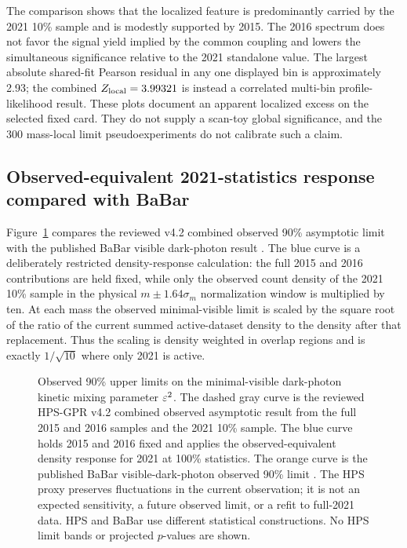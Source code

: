 The comparison shows that the localized feature is predominantly carried by the
2021 10\% sample and is modestly supported by 2015. The 2016 spectrum does not
favor the signal yield implied by the common coupling and lowers the
simultaneous significance relative to the 2021 standalone value. The largest
absolute shared-fit Pearson residual in any one displayed bin is approximately
2.93; the combined $Z_{\mathrm{local}}=3.99321$ is instead a
correlated multi-bin profile-likelihood result. These plots document an
apparent localized excess on the selected fixed card. They do not supply a
scan-toy global significance, and the 300 mass-local limit pseudoexperiments do
not calibrate such a claim.

\subsection{Observed-equivalent 2021-statistics response compared with BaBar}
\label{sec:results-v4p2-babar-response}

Figure~\ref{fig:results-v4p2-babar-response} compares the reviewed v4.2
combined observed 90\% asymptotic \CLs{} limit with the published BaBar visible
dark-photon result \cite{BaBarDarkPhoton2014}.  The blue curve is a deliberately
restricted density-response calculation: the full 2015 and 2016 contributions
are held fixed, while only the observed count density of the 2021 10\% sample
in the physical $m\pm1.64\sigma_m$ normalization window is multiplied by ten.
At each mass the observed minimal-visible limit is scaled by the square root of
the ratio of the current summed active-dataset density to the density after
that replacement.  Thus the scaling is density weighted in overlap regions and
is exactly $1/\sqrt{10}$ where only 2021 is active.

\begin{figure}[H]
\centering
{}
\caption{Observed 90\% upper limits on the minimal-visible dark-photon kinetic
mixing parameter $\varepsilon^2$.  The dashed gray curve is the reviewed HPS-GPR v4.2
combined observed asymptotic \CLs{} result from the full 2015 and 2016 samples
and the 2021 10\% sample.  The blue curve holds 2015 and 2016 fixed and applies
the observed-equivalent density response for 2021 at 100\% statistics.  The
orange curve is the published BaBar visible-dark-photon observed 90\% limit
\cite{BaBarDarkPhoton2014}.  The HPS proxy preserves fluctuations in the
current observation; it is not an expected sensitivity, a future observed
limit, or a refit to full-2021 data.  HPS and BaBar use different statistical
constructions.  No HPS limit bands or projected $p$-values are shown.}
\label{fig:results-v4p2-babar-response}
\end{figure}

